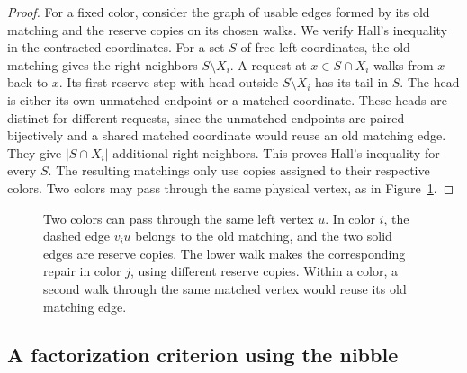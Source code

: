 \begin{proof}
For a fixed color, consider the graph of usable edges formed by its old matching and the reserve copies on its chosen walks. We verify Hall's inequality in the contracted coordinates. For a set \(S\) of free left coordinates, the old matching gives the right neighbors \(S\setminus X_i\). A request at \(x\in S\cap X_i\) walks from \(x\) back to \(x\). Its first reserve step with head outside \(S\setminus X_i\) has its tail in \(S\). The head is either its own unmatched endpoint or a matched coordinate. These heads are distinct for different requests, since the unmatched endpoints are paired bijectively and a shared matched coordinate would reuse an old matching edge. They give \(|S\cap X_i|\) additional right neighbors. This proves Hall's inequality for every \(S\). The resulting matchings only use copies assigned to their respective colors. Two colors may pass through the same physical vertex, as in Figure~\ref{fig:repair}.
\end{proof}

\begin{figure}[htbp]
\centering
{}
\caption{Two colors can pass through the same left vertex \(u\). In color \(i\), the dashed edge \(v_i u\) belongs to the old matching, and the two solid edges are reserve copies. The lower walk makes the corresponding repair in color \(j\), using different reserve copies. Within a color, a second walk through the same matched vertex would reuse its old matching edge.}\label{fig:repair}
\end{figure}

\subsection{A factorization criterion using the nibble}

